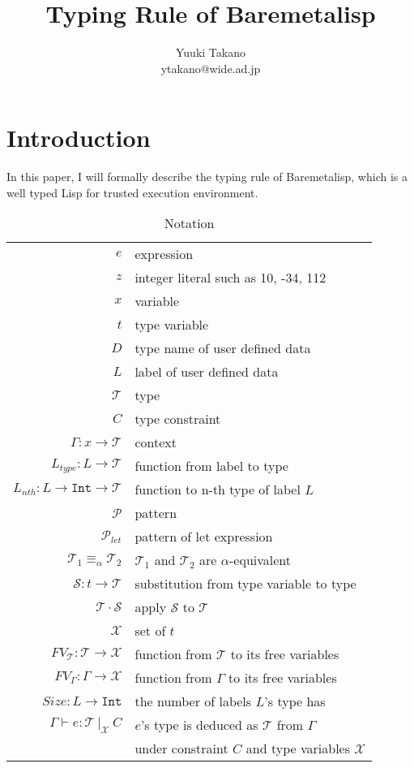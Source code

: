 \documentclass{article}
\title{Typing Rule of Baremetalisp}
\author{Yuuki Takano\\ ytakano@wide.ad.jp}
\begin{document}
\maketitle

\section{Introduction}

In this paper, I will formally describe the typing rule of Baremetalisp,
which is a well typed Lisp for trusted execution environment.

\begin{table}[tb]
    \centering
    \caption{Notation}
    \label{tab:notation}
    \begin{tabular}{rl}
        $e$ & expression \\
        $z$ & integer literal such as 10, -34, 112 \\
        $x$ & variable \\
        $t$ & type variable \\
        $D$ & type name of user defined data \\
        $L$ & label of user defined data \\
        $\mathcal{T}$ & type \\
        $C$ & type constraint \\
        $\Gamma : x \rightarrow \mathcal{T}$ & context \\
        $L_{type} : L \rightarrow \mathcal{T}$ & function from label to type \\
        $L_{nth} : L \rightarrow \mathtt{Int} \rightarrow \mathcal{T}$ & function to n-th type of label $L$ \\
        $\mathcal{P}$ & pattern \\
        $\mathcal{P}_{let}$ & pattern of let expression \\
        $\mathcal{T}_1 \equiv_\alpha \mathcal{T}_2$ & $\mathcal{T}_1$ and $\mathcal{T}_2$ are $\alpha$-equivalent \\
        $\mathcal{S} : t \rightarrow \mathcal{T}$ & substitution from type variable to type\\
        $\mathcal{T} \cdot \mathcal{S}$ & apply $\mathcal{S}$ to $\mathcal{T}$ \\
        $\mathcal{X}$ & set of $t$ \\
        $FV_\mathcal{T} : \mathcal{T} \rightarrow \mathcal{X}$ & function from $\mathcal{T}$ to its free variables\\
        $FV_\Gamma : \Gamma \rightarrow \mathcal{X}$ & function from $\Gamma$ to its free variables\\
        $Size : L \rightarrow \mathtt{Int}$ & the number of labels $L$'s type has \\
        $\Gamma \vdash e : \mathcal{T}\ |_\mathcal{X}\ C$ & $e$'s type is deduced as $\mathcal{T}$ from $\Gamma$ \\
        & under constraint $C$ and type variables $\mathcal{X}$
    \end{tabular}
\end{table}
\end{document}
